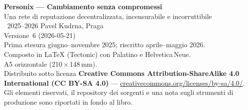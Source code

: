 \thispagestyle{empty}
\ifdefined\printmode\vspace*{\fill}\else{}\fi
\begin{flushleft}\small\sffamily
\textbf{Personix --- Cambiamento senza compromessi}\\[0.3em]
Una rete di reputazione decentralizzata, incensurabile e incorruttibile\\[1.4em]

\textcopyright\ 2025--2026 Pavel Kudrna, Praga\\[0.4em]

Versione~6 (2026-05-21)\\
Prima stesura giugno--novembre 2025; riscritto aprile--maggio 2026.\\[1.4em]

Composto in \LaTeX{} (Tectonic) con Palatino e Helvetica\,Neue.\\
A5 orizzontale (210\,$\times$\,148\,mm).\\[1.4em]

Distribuito sotto licenza \textbf{Creative Commons Attribution-ShareAlike 4.0
International (CC BY-SA 4.0)} ---
\href{https://creativecommons.org/licenses/by-sa/4.0/}{creativecommons.org/licenses/by-sa/4.0/}.
Gli elementi riservati, il repository dei sorgenti e una nota sugli strumenti
di produzione sono riportati in fondo al libro.
\end{flushleft}
\ifdefined\printmode\else{}\fi
\clearpage
